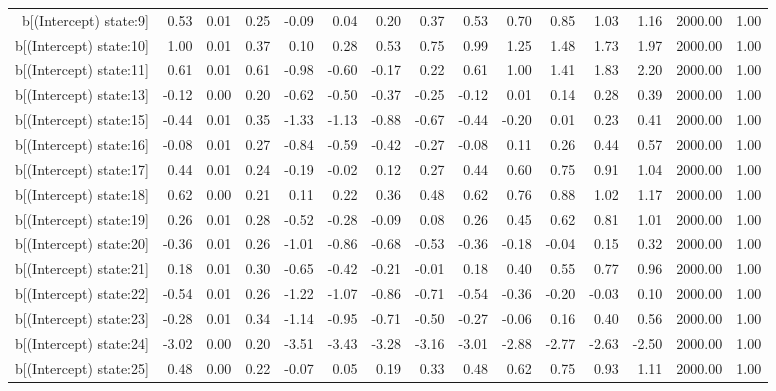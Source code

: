 \begin{table}[ht]
\begin{tabular}{rrrrrrrrrrrrrrr}
  b[(Intercept) state:9] & 0.53 & 0.01 & 0.25 & -0.09 & 0.04 & 0.20 & 0.37 & 0.53 & 0.70 & 0.85 & 1.03 & 1.16 & 2000.00 & 1.00 \\ 
  b[(Intercept) state:10] & 1.00 & 0.01 & 0.37 & 0.10 & 0.28 & 0.53 & 0.75 & 0.99 & 1.25 & 1.48 & 1.73 & 1.97 & 2000.00 & 1.00 \\ 
  b[(Intercept) state:11] & 0.61 & 0.01 & 0.61 & -0.98 & -0.60 & -0.17 & 0.22 & 0.61 & 1.00 & 1.41 & 1.83 & 2.20 & 2000.00 & 1.00 \\ 
  b[(Intercept) state:13] & -0.12 & 0.00 & 0.20 & -0.62 & -0.50 & -0.37 & -0.25 & -0.12 & 0.01 & 0.14 & 0.28 & 0.39 & 2000.00 & 1.00 \\ 
  b[(Intercept) state:15] & -0.44 & 0.01 & 0.35 & -1.33 & -1.13 & -0.88 & -0.67 & -0.44 & -0.20 & 0.01 & 0.23 & 0.41 & 2000.00 & 1.00 \\ 
  b[(Intercept) state:16] & -0.08 & 0.01 & 0.27 & -0.84 & -0.59 & -0.42 & -0.27 & -0.08 & 0.11 & 0.26 & 0.44 & 0.57 & 2000.00 & 1.00 \\ 
  b[(Intercept) state:17] & 0.44 & 0.01 & 0.24 & -0.19 & -0.02 & 0.12 & 0.27 & 0.44 & 0.60 & 0.75 & 0.91 & 1.04 & 2000.00 & 1.00 \\ 
  b[(Intercept) state:18] & 0.62 & 0.00 & 0.21 & 0.11 & 0.22 & 0.36 & 0.48 & 0.62 & 0.76 & 0.88 & 1.02 & 1.17 & 2000.00 & 1.00 \\ 
  b[(Intercept) state:19] & 0.26 & 0.01 & 0.28 & -0.52 & -0.28 & -0.09 & 0.08 & 0.26 & 0.45 & 0.62 & 0.81 & 1.01 & 2000.00 & 1.00 \\ 
  b[(Intercept) state:20] & -0.36 & 0.01 & 0.26 & -1.01 & -0.86 & -0.68 & -0.53 & -0.36 & -0.18 & -0.04 & 0.15 & 0.32 & 2000.00 & 1.00 \\ 
  b[(Intercept) state:21] & 0.18 & 0.01 & 0.30 & -0.65 & -0.42 & -0.21 & -0.01 & 0.18 & 0.40 & 0.55 & 0.77 & 0.96 & 2000.00 & 1.00 \\ 
  b[(Intercept) state:22] & -0.54 & 0.01 & 0.26 & -1.22 & -1.07 & -0.86 & -0.71 & -0.54 & -0.36 & -0.20 & -0.03 & 0.10 & 2000.00 & 1.00 \\ 
  b[(Intercept) state:23] & -0.28 & 0.01 & 0.34 & -1.14 & -0.95 & -0.71 & -0.50 & -0.27 & -0.06 & 0.16 & 0.40 & 0.56 & 2000.00 & 1.00 \\ 
  b[(Intercept) state:24] & -3.02 & 0.00 & 0.20 & -3.51 & -3.43 & -3.28 & -3.16 & -3.01 & -2.88 & -2.77 & -2.63 & -2.50 & 2000.00 & 1.00 \\ 
  b[(Intercept) state:25] & 0.48 & 0.00 & 0.22 & -0.07 & 0.05 & 0.19 & 0.33 & 0.48 & 0.62 & 0.75 & 0.93 & 1.11 & 2000.00 & 1.00 \\ 

\end{tabular}
\end{table}
